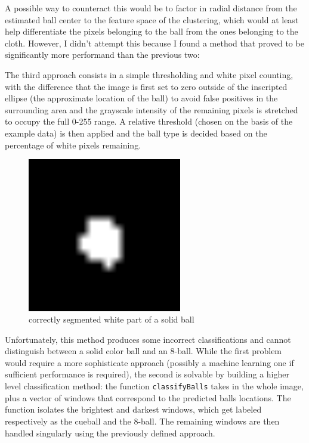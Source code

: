 A possible way to counteract this would be to factor in radial distance 
from the estimated ball center to the feature space of the clustering, 
which would at least help differentiate the pixels belonging to the 
ball from the ones belonging to the cloth. However, I didn't attempt 
this because I found a method that proved to be significantly more 
performand than the previous two:

The third approach consists in a simple thresholding and white pixel 
counting, with the difference that the image is first set to zero 
outside of the inscripted ellipse (the approximate location of the ball)
to avoid false positives in the surrounding area and the grayscale 
intensity of the remaining pixels is stretched to occupy the full 
0-255 range. A relative threshold (chosen on the basis of the example 
data) is then applied and the ball type is decided based on the 
percentage of white pixels remaining.

\begin{figure}
  \includegraphics[width=0.6\textwidth]{./imgs/difficult_solid_identified.png}
  \caption{correctly segmented white part of a solid ball}
\end{figure}

Unfortunately, this method produces some incorrect classifications 
and cannot distinguish between a solid color ball and an 8-ball. 
While the first problem would require a more sophisticate approach 
(possibly a machine learning one if sufficient performance is 
required), the second is solvable by building a higher level 
classification method: the function \verb|classifyBalls| takes 
in the whole image, plus a vector of windows that correspond to 
the predicted balls locations. 
The function isolates the brightest and darkest windows, which 
get labeled respectively as the cueball and the 8-ball. 
The remaining windows are then handled singularly using the previously 
defined approach.